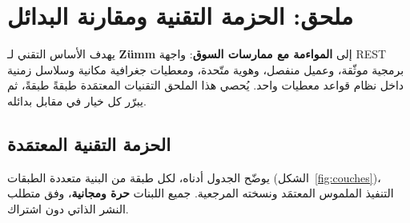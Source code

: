 
\chapter{ملحق: الحزمة التقنية ومقارنة البدائل}
\label{chap:technologies}
يهدف الأساس التقني لـ \textbf{Zümm} إلى \textbf{المواءمة مع ممارسات السوق}:
واجهة REST برمجية موثّقة، وعميل منفصل، وهوية متّحدة، ومعطيات جغرافية مكانية
وسلاسل زمنية داخل نظام قواعد معطيات واحد. يُحصي هذا الملحق التقنيات المعتمَدة
طبقةً طبقةً، ثم يبرّر كل خيار في مقابل بدائله.

\section{الحزمة التقنية المعتمَدة}
يوضّح الجدول أدناه، لكل طبقة من البنية متعددة الطبقات (الشكل~\ref{fig:couches})،
التنفيذ الملموس المعتمَد ونسخته المرجعية. جميع اللبنات \textbf{حرة ومجانية}، وفق
متطلب النشر الذاتي دون اشتراك.

